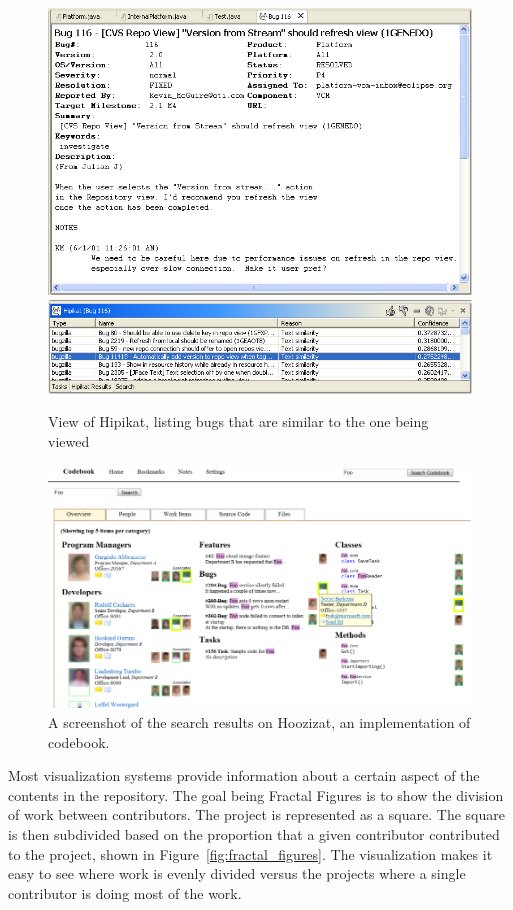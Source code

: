 \begin{figure}[htpb]
  \centering
  \includegraphics[width=0.9\linewidth]{Figures/introduction/hipikat_bug.png}
  \includegraphics[width=0.9\linewidth]{Figures/introduction/hipikat.png}
  \caption{View of Hipikat, listing bugs that are similar to the one
  being viewed}
  \label{fig:hipikat}
\end{figure}

\begin{figure}[htpb]
  \centering
  \includegraphics[width=0.8\linewidth]{Figures/introduction/codebook.png}
  \caption{A screenshot of the search results on Hoozizat, an
    implementation of codebook.}
  \label{fig:codebook}
\end{figure}

Most visualization systems provide information about a certain aspect of
the contents in the repository. The goal being Fractal
Figures\cite{Ambros2005} is to show the division of work between
contributors. The project is represented as a square. The square is then
subdivided based on the proportion that a given contributor contributed
to the project, shown in Figure~\ref{fig:fractal_figures}. The
visualization makes it easy to see where work is evenly divided versus
the projects where a single contributor is doing most of the work.


